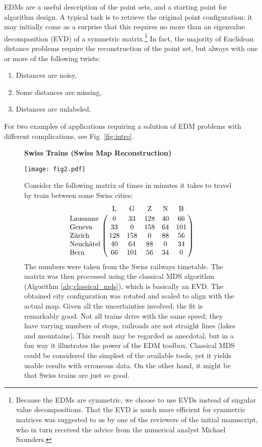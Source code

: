 \documentclass[10pt,double]{IEEEtran}
\newcommand{\rev}[1]{{#1}}
\begin{document}
EDMs are a useful description of the point sets, and a starting point for
algorithm design. A typical task is to retrieve the original point
configuration: it may initially come as a surprise that this requires no more
than an eigenvalue decomposition (EVD) of a symmetric
matrix.\footnote{\rev{Because the EDMs are symmetric, we choose to use EVDs
instead of singular value decompositions. That the EVD is much more efficient for
symmetric matrices was suggested to us by one of the reviewers of the initial
manuscript, who in turn received the advice from the numerical analyst Michael
Saunders.}} In fact, the majority of Euclidean distance problems require the
reconstruction of the point set, but always with one or more of the following
twists:
\begin{enumerate}
	\item Distances are noisy,
	\item Some distances are missing,
	\item Distances are unlabeled.
\end{enumerate}
For two examples of applications requiring a solution of EDM problems with
different complications, see Fig. \ref{fig:intro}.
\begin{figure}[t]
\selectfont
\begin{spmagbox}
\textbf{Swiss Trains (Swiss Map Reconstruction)}
\\
\fontsize{9pt}{10pt}
\begin{center}
	\texttt{[image: fig2.pdf]}
\end{center}
\vspace{8mm}

\selectfont
Consider the following matrix of times in minutes it takes to travel by train
between some Swiss cities:
\begin{equation*}
\bordermatrix{     & \text{L} & \text{G} & \text{Z} & \text{N} & \text{B} \cr
\text{Lausanne}    & 0   & 33  & 128 & 40 & 66  \cr
\text{Geneva}      & 33  & 0   & 158 & 64 & 101 \cr
\text{Z\"urich}    & 128 & 158 & 0   & 88 & 56  \cr
\text{Neuch\^atel} & 40  & 64  & 88  & 0  & 34  \cr
\text{Bern}        & 66  & 101 & 56  & 34 & 0   \cr
}
\end{equation*}
The numbers were taken from the Swiss railways timetable. The matrix
was then processed using the classical MDS algorithm (Algorithm
\ref{alg:classical_mds}), which is basically an EVD. The obtained city
configuration was rotated and scaled to align with the actual map. Given all
the uncertainties involved, the fit is remarkably good. Not all trains drive
with the same speed; they have varying numbers of stops, railroads are not
straight lines (lakes and mountains). This result may be regarded as
anecdotal, but in a fun way it illustrates the power of the EDM toolbox.
Classical MDS could be considered the simplest of the available tools, yet it
yields usable results with erroneous data. On the other hand, it might be that
Swiss trains are just so good. 
\end{spmagbox}
\end{figure}
\end{document}
